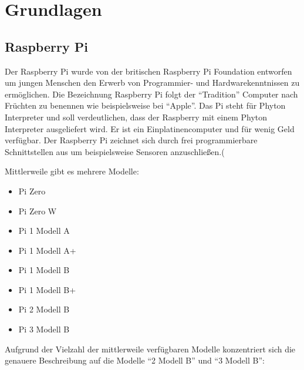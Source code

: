 
\chapter{Grundlagen}
\section{Raspberry Pi}\label{Raspberry}
Der Raspberry Pi wurde von der britischen Raspberry Pi Foundation entworfen um jungen Menschen den Erwerb von Programmier- und Hardwarekenntnissen zu
ermöglichen. Die Bezeichnung Raspberry Pi folgt der "`Tradition"' Computer nach Früchten zu benennen wie beispielsweise bei "`Apple"'. Das Pi steht für Phyton Interpreter und soll verdeutlichen, dass der Raspberry mit einem Phyton Interpreter ausgeliefert wird. Er ist ein Einplatinencomputer und für wenig Geld verfügbar. Der Raspberry Pi zeichnet sich durch frei programmierbare Schnittstellen aus um beispielsweise Sensoren anzuschließen.(\cite{SWB-435432907}

Mittlerweile gibt es mehrere Modelle:

\begin{itemize} 
\item Pi Zero 
\item Pi Zero W
\item Pi 1 Modell A
\item Pi 1 Modell A+
\item Pi 1 Modell B
\item Pi 1 Modell B+
\item Pi 2 Modell B
\item Pi 3 Modell B 
\end{itemize}

Aufgrund der Vielzahl der mittlerweile verfügbaren Modelle konzentriert sich die genauere Beschreibung auf die Modelle "`2 Modell B"' und "`3 Modell B"':

